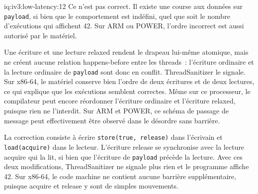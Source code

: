 \begin{solution}{iq:iv3:low-latency:12}
Ce n'est pas correct. Il existe une course aux données sur \texttt{payload}, si bien que le comportement est indéfini, quel que soit le nombre d'exécutions qui affichent 42. Sur ARM ou POWER, l'ordre incorrect est aussi autorisé par le matériel.

Une écriture et une lecture relaxed rendent le drapeau lui-même atomique, mais ne créent aucune relation happens-before entre les threads~: l'écriture ordinaire et la lecture ordinaire de \texttt{payload} sont donc en conflit. ThreadSanitizer le signale. Sur x86-64, le matériel conserve bien l'ordre de deux écritures et de deux lectures, ce qui explique que les exécutions semblent correctes. Même sur ce processeur, le compilateur peut encore réordonner l'écriture ordinaire et l'écriture relaxed, puisque rien ne l'interdit. Sur ARM et POWER, ce schéma de passage de message peut effectivement être observé dans le désordre sans barrière.

La correction consiste à écrire \texttt{store(true, release)} dans l'écrivain et \texttt{load(acquire)} dans le lecteur. L'écriture release se synchronise avec la lecture acquire qui la lit, si bien que l'écriture de \texttt{payload} précède la lecture. Avec ces deux modifications, ThreadSanitizer ne signale plus rien et le programme affiche 42. Sur x86-64, le code machine ne contient aucune barrière supplémentaire, puisque acquire et release y sont de simples mouvements.

\end{solution}

